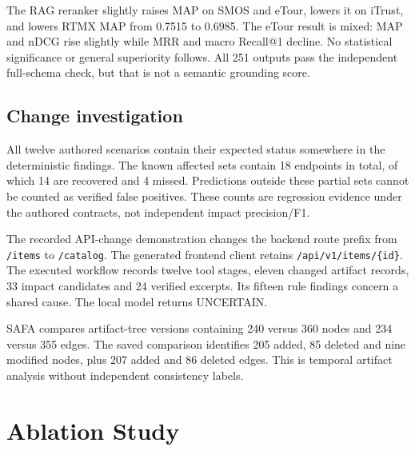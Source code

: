 \documentclass[
  11pt,
  a4paper,
]{report}
\begin{document}
The RAG reranker slightly raises MAP on SMOS and eTour, lowers it on
iTrust, and lowers RTMX MAP from 0.7515 to 0.6985. The eTour result is
mixed: MAP and nDCG rise slightly while MRR and macro Recall@1 decline.
No statistical significance or general superiority follows. All 251
outputs pass the independent full-schema check, but that is not a
semantic grounding score.

\hypertarget{change-investigation}{%
\section{Change investigation}\label{change-investigation}}

All twelve authored scenarios contain their expected status somewhere in
the deterministic findings. The known affected sets contain 18 endpoints
in total, of which 14 are recovered and 4 missed. Predictions outside
these partial sets cannot be counted as verified false positives. These
counts are regression evidence under the authored contracts, not
independent impact precision/F1.

The recorded API-change demonstration changes the backend route prefix
from \texttt{/items} to \texttt{/catalog}. The generated frontend client
retains \texttt{/api/v1/items/\{id\}}. The executed workflow records
twelve tool stages, eleven changed artifact records, 33 impact
candidates and 24 verified excerpts. Its fifteen rule findings concern a
shared cause. The local model returns UNCERTAIN.

SAFA compares artifact-tree versions containing 240 versus 360 nodes and
234 versus 355 edges. The saved comparison identifies 205 added, 85
deleted and nine modified nodes, plus 207 added and 86 deleted edges.
This is temporal artifact analysis without independent consistency
labels.

\hypertarget{ablation-study}{%
\chapter{Ablation Study}\label{ablation-study}}
\end{document}
